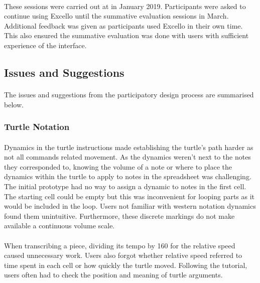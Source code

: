 \paragraph{} These sessions were carried out at in January 2019. Participants were asked to continue using Excello until the summative evaluation sessions in March. Additional feedback was given as participants used Excello in their own time. This also ensured the summative evaluation was done with users with sufficient experience of the interface.

\subsection{Issues and Suggestions}

\paragraph{} The issues and suggestions from the participatory design process are summarised below.

\subsubsection{Turtle Notation}

\paragraph{} Dynamics in the turtle instructions made establishing the turtle's path harder as not all commands related movement. As the dynamics weren't next to the notes they corresponded to, knowing the volume of a note or where to place the dynamics within the turtle to apply to notes in the spreadsheet was challenging. The initial prototype had no way to assign a dynamic to notes in the first cell. The starting cell could be empty but this was inconvenient for looping parts as it would be included in the loop. Users not familiar with western notation dynamics found them unintuitive. Furthermore, these discrete markings do not make available a continuous volume scale.

\paragraph{} When transcribing a piece, dividing its tempo by 160 for the relative speed caused unnecessary work. Users also forgot whether relative speed referred to time spent in each cell or how quickly the turtle moved. Following the tutorial, users often had to check the position and meaning of turtle arguments.

